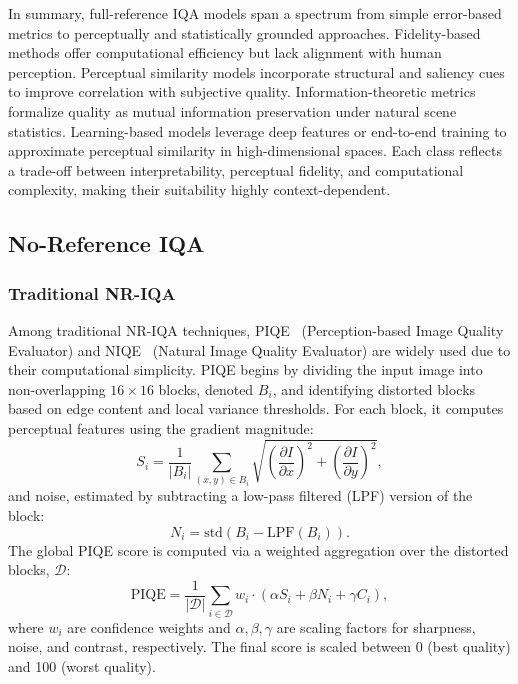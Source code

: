 In summary, full-reference IQA models span a spectrum from simple error-based metrics to perceptually and statistically grounded approaches. Fidelity-based methods offer computational efficiency but lack alignment with human perception. Perceptual similarity models incorporate structural and saliency cues to improve correlation with subjective quality. Information-theoretic metrics formalize quality as mutual information preservation under natural scene statistics. Learning-based models leverage deep features or end-to-end training to approximate perceptual similarity in high-dimensional spaces. Each class reflects a trade-off between interpretability, perceptual fidelity, and computational complexity, making their suitability highly context-dependent.

\subsection{No-Reference IQA}\label{sec:no_reference_iqa}

\subsubsection{Traditional NR-IQA}\label{sec:traditional_nr_iqa}

Among traditional NR-IQA techniques, PIQE~\cite{piqe2016} (Perception-based Image Quality Evaluator) and NIQE~\cite{mittal2013making} (Natural Image Quality Evaluator) are widely used due to their computational simplicity. PIQE begins by dividing the input image into non-overlapping $16 \times 16$ blocks, denoted $B_i$, and identifying distorted blocks based on edge content and local variance thresholds. For each block, it computes perceptual features using the gradient magnitude:
\begin{equation}
S_i = \frac{1}{|B_i|} \sum_{(x,y) \in B_i} \sqrt{ {\left( \frac{\partial I}{\partial x} \right)}^2 + {\left( \frac{\partial I}{\partial y} \right)}^2 },
\end{equation}
and noise, estimated by subtracting a low-pass filtered (LPF) version of the block:
\begin{equation}
N_i = \text{std}\left( B_i - \text{LPF}(B_i) \right).
\end{equation}
The global PIQE score is computed via a weighted aggregation over the distorted blocks, $\mathcal{D}$:
\begin{equation}
\text{PIQE} = \frac{1}{|\mathcal{D}|} \sum_{i \in \mathcal{D}} w_i \cdot ( \alpha S_i + \beta N_i + \gamma C_i ),
\end{equation}
where $w_i$ are confidence weights and $\alpha, \beta, \gamma$ are scaling factors for sharpness, noise, and contrast, respectively. The final score is scaled between 0 (best quality) and 100 (worst quality).

